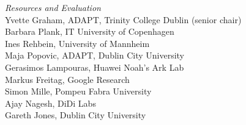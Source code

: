 \emph{Resources and Evaluation} \\
\hspace*{0.2in} Yvette Graham, ADAPT, Trinity College Dublin (senior chair)\\
\hspace*{0.2in} Barbara Plank, IT University of Copenhagen\\
\hspace*{0.2in} Ines Rehbein, University of Mannheim\\
\hspace*{0.2in} Maja Popovic, ADAPT, Dublin City University\\
\hspace*{0.2in} Gerasimos Lampouras, Huawei Noah’s Ark Lab\\
\hspace*{0.2in} Markus Freitag, Google Research\\
\hspace*{0.2in} Simon Mille, Pompeu Fabra University\\
\hspace*{0.2in} Ajay Nagesh, DiDi Labs\\
\hspace*{0.2in} Gareth Jones, Dublin City University\\

